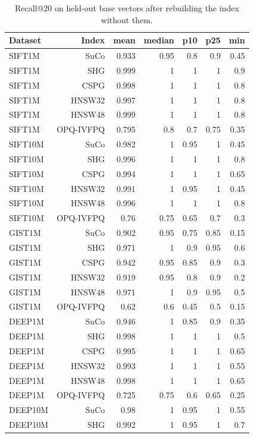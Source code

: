 \begin{table}[t]
\centering
\small
\caption{Recall@20 on held-out base vectors after rebuilding the index without them.}
\label{tab:unseen}
\begin{tabular}{lrrrrrr}
\toprule
Dataset & Index & mean & median & p10 & p25 & min \\
\midrule
SIFT1M & SuCo & 0.933 & 0.95 & 0.8 & 0.9 & 0.45 \\
SIFT1M & SHG & 0.999 & 1 & 1 & 1 & 0.9 \\
SIFT1M & CSPG & 0.998 & 1 & 1 & 1 & 0.8 \\
SIFT1M & HNSW32 & 0.997 & 1 & 1 & 1 & 0.8 \\
SIFT1M & HNSW48 & 0.999 & 1 & 1 & 1 & 0.8 \\
SIFT1M & OPQ-IVFPQ & 0.795 & 0.8 & 0.7 & 0.75 & 0.35 \\
SIFT10M & SuCo & 0.982 & 1 & 0.95 & 1 & 0.45 \\
SIFT10M & SHG & 0.996 & 1 & 1 & 1 & 0.8 \\
SIFT10M & CSPG & 0.994 & 1 & 1 & 1 & 0.65 \\
SIFT10M & HNSW32 & 0.991 & 1 & 0.95 & 1 & 0.45 \\
SIFT10M & HNSW48 & 0.996 & 1 & 1 & 1 & 0.8 \\
SIFT10M & OPQ-IVFPQ & 0.76 & 0.75 & 0.65 & 0.7 & 0.3 \\
GIST1M & SuCo & 0.902 & 0.95 & 0.75 & 0.85 & 0.15 \\
GIST1M & SHG & 0.971 & 1 & 0.9 & 0.95 & 0.6 \\
GIST1M & CSPG & 0.942 & 0.95 & 0.85 & 0.9 & 0.3 \\
GIST1M & HNSW32 & 0.919 & 0.95 & 0.8 & 0.9 & 0.2 \\
GIST1M & HNSW48 & 0.971 & 1 & 0.9 & 0.95 & 0.5 \\
GIST1M & OPQ-IVFPQ & 0.62 & 0.6 & 0.45 & 0.5 & 0.15 \\
DEEP1M & SuCo & 0.946 & 1 & 0.85 & 0.9 & 0.35 \\
DEEP1M & SHG & 0.998 & 1 & 1 & 1 & 0.5 \\
DEEP1M & CSPG & 0.995 & 1 & 1 & 1 & 0.65 \\
DEEP1M & HNSW32 & 0.993 & 1 & 1 & 1 & 0.55 \\
DEEP1M & HNSW48 & 0.998 & 1 & 1 & 1 & 0.65 \\
DEEP1M & OPQ-IVFPQ & 0.725 & 0.75 & 0.6 & 0.65 & 0.25 \\
DEEP10M & SuCo & 0.98 & 1 & 0.95 & 1 & 0.55 \\
DEEP10M & SHG & 0.992 & 1 & 0.95 & 1 & 0.7 \\

\end{tabular}
\end{table}
